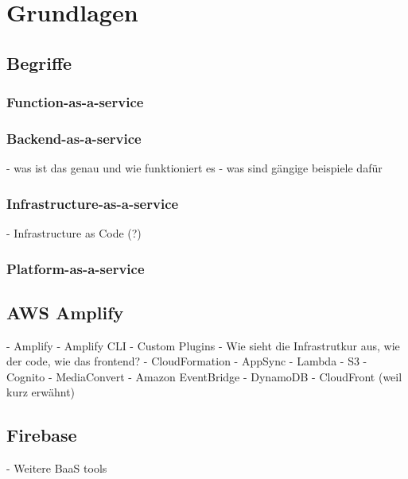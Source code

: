 \chapter{Grundlagen}

\section{Begriffe}
  \autocite{jiang2020overview}
  \autocite{kumar2019serverless}
  \autocite{dahunsi2021commercial}

  \subsection{Function-as-a-service}
  \subsection{Backend-as-a-service}
  - was ist das genau und wie funktioniert es
  - was sind gängige beispiele dafür
  \subsection{Infrastructure-as-a-service}
- Infrastructure as Code (?)

  \subsection{Platform-as-a-service}

\section{AWS Amplify}

\autocite{dahunsi2021commercial}
\autocite{amplifyDocs}
\autocite{lysakov2021security}
\autocite{mathew2014overview}
\autocite{beach2014aws}

  - Amplify
  - Amplify CLI
  - Custom Plugins
  - Wie sieht die Infrastrutkur aus, wie der code, wie das frontend?
  - CloudFormation
  - AppSync
  - Lambda
  - S3
  - Cognito
  - MediaConvert
  - Amazon EventBridge
  - DynamoDB
  - CloudFront (weil kurz erwähnt)

\section{Firebase}

\autocite{moroney2017definitive}
\autocite{firebaseDocs}
\autocite{tanna2018serverless}

- Weitere BaaS tools
